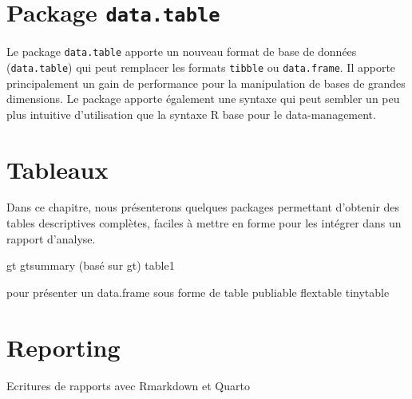 \documentclass[
]{book}
\begin{document}
\chapter{\texorpdfstring{Package \texttt{data.table}}{Package data.table}}\label{package-data.table}

Le package \texttt{data.table} apporte un nouveau format de base de données (\texttt{data.table}) qui peut remplacer les formats \texttt{tibble} ou \texttt{data.frame}. Il apporte principalement un gain de performance pour la manipulation de bases de grandes dimensions. Le package apporte également une syntaxe qui peut sembler un peu plus intuitive d'utilisation que la syntaxe R base pour le data-management.

\chapter{Tableaux}\label{tableaux}

Dans ce chapitre, nous présenterons quelques packages permettant d'obtenir des tables descriptives complètes, faciles à mettre en forme pour les intégrer dans un rapport d'analyse.

gt
gtsummary (basé sur gt)
table1

pour présenter un data.frame sous forme de table publiable
flextable
tinytable

\chapter{Reporting}\label{reporting}

Ecritures de rapports avec Rmarkdown et Quarto
\end{document}
